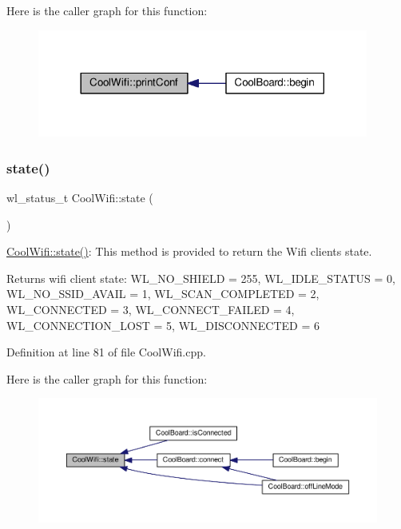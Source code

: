 Here is the caller graph for this function\+:
\nopagebreak
\begin{figure}[H]
\begin{center}
\leavevmode
\includegraphics[width=308pt]{class_cool_wifi_a9e6105c6d13d35ec510f6633da9e0223_icgraph}
\end{center}
\end{figure}
\mbox{\label{class_cool_wifi_a1c7b4d82a4098d346e7593dce92039fa}} 
\subsubsection{\texorpdfstring{state()}{state()}}
{\footnotesize\ttfamily wl\+\_\+status\+\_\+t Cool\+Wifi\+::state (\begin{DoxyParamCaption}{ }\end{DoxyParamCaption})}

\hyperlink{class_cool_wifi_a1c7b4d82a4098d346e7593dce92039fa}{Cool\+Wifi\+::state()}\+: This method is provided to return the Wifi client\textquotesingle{}s state. \begin{DoxyReturn}{Returns}
wifi client state\+: W\+L\+\_\+\+N\+O\+\_\+\+S\+H\+I\+E\+LD = 255, W\+L\+\_\+\+I\+D\+L\+E\+\_\+\+S\+T\+A\+T\+US = 0, W\+L\+\_\+\+N\+O\+\_\+\+S\+S\+I\+D\+\_\+\+A\+V\+A\+IL = 1, W\+L\+\_\+\+S\+C\+A\+N\+\_\+\+C\+O\+M\+P\+L\+E\+T\+ED = 2, W\+L\+\_\+\+C\+O\+N\+N\+E\+C\+T\+ED = 3, W\+L\+\_\+\+C\+O\+N\+N\+E\+C\+T\+\_\+\+F\+A\+I\+L\+ED = 4, W\+L\+\_\+\+C\+O\+N\+N\+E\+C\+T\+I\+O\+N\+\_\+\+L\+O\+ST = 5, W\+L\+\_\+\+D\+I\+S\+C\+O\+N\+N\+E\+C\+T\+ED = 6 
\end{DoxyReturn}


Definition at line 81 of file Cool\+Wifi.\+cpp.

Here is the caller graph for this function\+:
\nopagebreak
\begin{figure}[H]
\begin{center}
\leavevmode
\includegraphics[width=350pt]{class_cool_wifi_a1c7b4d82a4098d346e7593dce92039fa_icgraph}
\end{center}
\end{figure}


